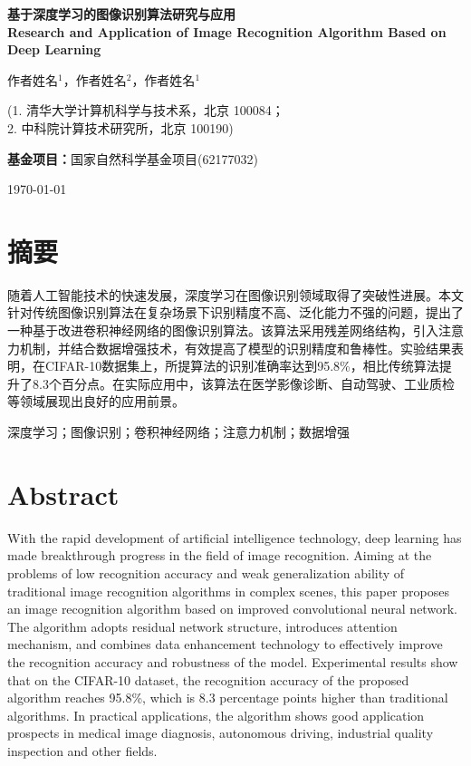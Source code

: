 \documentclass[a4paper,12pt]{ctexart}
\newenvironment{cnabstract}{
    \section*{\heiti\zihao{-4} 摘要}
    \zihao{5}\fangsong
}{}
\newcommand{\cnkeywords}[1]{
    \vspace{1em}
    \noindent{\heiti\zihao{5} 关键词：}
    \zihao{5}\fangsong #1
}
\newenvironment{enabstract}{
    \section*{\textbf{\zihao{-4} Abstract}}
    \zihao{5}
}{}
\begin{document}
\begin{titlepage}
\centering
\vspace*{2cm}

{\heiti\bfseries
基于深度学习的图像识别算法研究与应用\\[0.5cm]
\textbf{Research and Application of Image Recognition Algorithm Based on Deep Learning}
}

\vspace{2cm}

{\kaishu
作者姓名$^{1}$，作者姓名$^{2}$，作者姓名$^{1}$\\[0.3cm]
}

{\songti
(1. 清华大学计算机科学与技术系，北京 100084；\\
 2. 中科院计算技术研究所，北京 100190)
}

\vspace{1cm}

{\songti
\textbf{基金项目：}国家自然科学基金项目(62177032)
}

\vfill

{\songti
\today
}

\end{titlepage}

\newpage
\thispagestyle{plain}

\begin{cnabstract}
随着人工智能技术的快速发展，深度学习在图像识别领域取得了突破性进展。本文针对传统图像识别算法在复杂场景下识别精度不高、泛化能力不强的问题，提出了一种基于改进卷积神经网络的图像识别算法。该算法采用残差网络结构，引入注意力机制，并结合数据增强技术，有效提高了模型的识别精度和鲁棒性。实验结果表明，在CIFAR-10数据集上，所提算法的识别准确率达到95.8\%，相比传统算法提升了8.3个百分点。在实际应用中，该算法在医学影像诊断、自动驾驶、工业质检等领域展现出良好的应用前景。
\end{cnabstract}

\cnkeywords{深度学习；图像识别；卷积神经网络；注意力机制；数据增强}

\vspace{2em}

\begin{enabstract}
With the rapid development of artificial intelligence technology, deep learning has made breakthrough progress in the field of image recognition. Aiming at the problems of low recognition accuracy and weak generalization ability of traditional image recognition algorithms in complex scenes, this paper proposes an image recognition algorithm based on improved convolutional neural network. The algorithm adopts residual network structure, introduces attention mechanism, and combines data enhancement technology to effectively improve the recognition accuracy and robustness of the model. Experimental results show that on the CIFAR-10 dataset, the recognition accuracy of the proposed algorithm reaches 95.8\%, which is 8.3 percentage points higher than traditional algorithms. In practical applications, the algorithm shows good application prospects in medical image diagnosis, autonomous driving, industrial quality inspection and other fields.
\end{enabstract}
\end{document}
